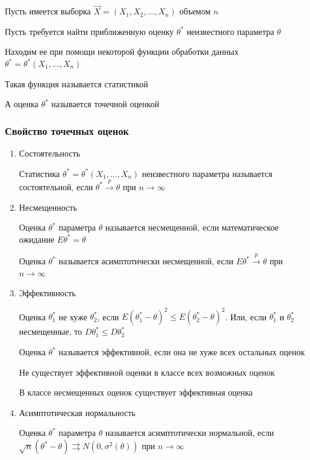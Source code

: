 \documentclass[12pt]{article}
\begin{document}
\hypertarget{point_estimation}{}

Пусть имеется выборка $\vec{X} = (X_1, X_2, \dots, X_n)$ объемом $n$

Пусть требуется найти приближенную оценку $\theta^*$ неизвестного параметра $\theta$

Находим ее при помощи некоторой функции обработки данных $\theta^* = \theta^*(X_1, \dots, X_n)$

\Def Такая функция называется статистикой

\Defs А оценка $\theta^*$ называется точечной оценкой

\subsubsection{Свойство точечных оценок}

\begin{enumerate}
    \item Состоятельность

    \Defs Статистика $\theta^* = \theta^*(X_1, \dots, X_n)$ неизвестного параметра называется
    состоятельной, если $\theta^* \overset{p}{\longrightarrow} \theta$ при $n \to \infty$

    \mediumvspace

    \item Несмещенность

    \Defs Оценка $\theta^*$ параметра $\theta$ называется несмещенной, если 
    математическое ожидание $E \theta^* = \theta$
    
    \Notas Оценка $\theta^*$ называется асимптотически несмещенной, если 
    $E \theta^* \overset{p}{\longrightarrow} \theta$ при $n \to \infty$

    \mediumvspace

    \item Эффективность 

    \Defs Оценка $\theta^*_1$ не хуже $\theta^*_2$, если $E (\theta^*_1 - \theta)^2 \leq E (\theta^*_2 - \theta)^2$.
    Или, если $\theta^*_1$ и $\theta^*_2$ несмещенные, то $D \theta^*_1 \leq D \theta^*_2$

    \Defs Оценка $\theta^*$ называется эффективной, если она не хуже всех остальных оценок

    \Notas Не существует эффективной оценки в классе всех возможных оценок

    \begin{MyTheorem}
        \Ths В классе несмещенных оценок существует эффективная оценка
    \end{MyTheorem}

    \mediumvspace

    \item Асимптотическая нормальность

    \Defs Оценка $\theta^*$ параметра $\theta$ называется асимптотически нормальной, если 
    $\sqrt{n} (\theta^* - \theta) \rightrightarrows N(0, \sigma^2 (\theta))$ при $n \to \infty$
    
\end{enumerate}
\end{document}

